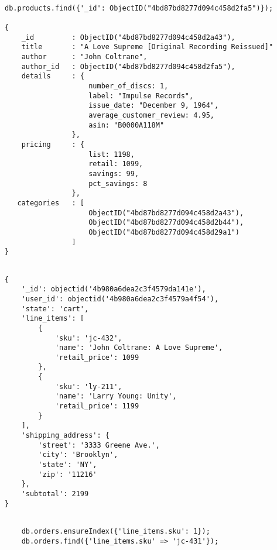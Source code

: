 \chapter{\pseudoSchemaCPT \ecommerce }\label{ap:pseudo_schema_ecommerce}

\medskip
\begin{lstlisting}[caption= Busqueda en MongoDB, label=source:javascript:example_search_mongodb]

db.products.find({'_id': ObjectID("4bd87bd8277d094c458d2fa5")});

{
    _id         : ObjectID("4bd87bd8277d094c458d2a43"),
    title       : "A Love Supreme [Original Recording Reissued]"
    author      : "John Coltrane",
    author_id   : ObjectID("4bd87bd8277d094c458d2fa5"),
    details     : {
                    number_of_discs: 1,
                    label: "Impulse Records",
                    issue_date: "December 9, 1964",
                    average_customer_review: 4.95,
                    asin: "B0000A118M"
                },
    pricing     : {
                    list: 1198,
                    retail: 1099,
                    savings: 99,
                    pct_savings: 8
                },
   categories   : [
                    ObjectID("4bd87bd8277d094c458d2a43"),
                    ObjectID("4bd87bd8277d094c458d2b44"), 
                    ObjectID("4bd87bd8277d094c458d29a1")
                ]
}
\end{lstlisting}


\medskip
\begin{lstlisting}[caption= Estructura de una \orderCommerce., label=source:javascript:example_schema_order]

{
    '_id': objectid('4b980a6dea2c3f4579da141e'),
    'user_id': objectid('4b980a6dea2c3f4579a4f54'),
    'state': 'cart',
    'line_items': [
        {
            'sku': 'jc-432',
            'name': 'John Coltrane: A Love Supreme',
            'retail_price': 1099
        },
        {
            'sku': 'ly-211',
            'name': 'Larry Young: Unity',
            'retail_price': 1199
        }
    ],
    'shipping_address': {
        'street': '3333 Greene Ave.',
        'city': 'Brooklyn',
        'state': 'NY',
        'zip': '11216'
    },
    'subtotal': 2199
}
\end{lstlisting}

\medskip
\begin{lstlisting}[caption= Consulta eficiente con \secIndexesDB., label=source:javascript:example_querying_orders_mongodb]

    db.orders.ensureIndex({'line_items.sku': 1});
    db.orders.find({'line_items.sku' => 'jc-431'});
    
\end{lstlisting}



